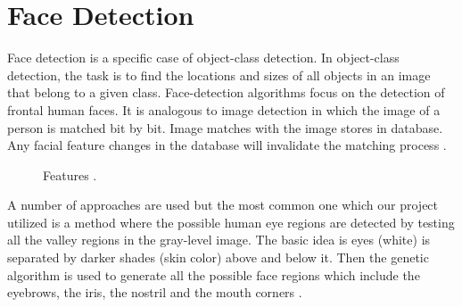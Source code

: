 \documentclass[9pt,twocolumn,twoside]{../../styles/osajnl}
\begin{document}
\section{Face Detection}

Face detection is a specific case of object-class detection. In
object-class detection, the task is to find the locations and sizes of
all objects in an image that belong to a given class. Face-detection
algorithms focus on the detection of frontal human faces. It is
analogous to image detection in which the image of a person is matched
bit by bit. Image matches with the image stores in database. Any
facial feature changes in the database will invalidate the matching
process \cite{fd-using-haar}.

\begin{figure}[htbp]
\centering
{}
\caption{Features \cite{fd-using-haar}.}
\label{fig:false-color}
\end{figure}

A number of approaches are used but the most common one which our
project utilized is a method where the possible human eye regions are
detected by testing all the valley regions in the gray-level
image. The basic idea is eyes (white) is separated by darker shades
(skin color) above and below it. Then the genetic algorithm is used to
generate all the possible face regions which include the eyebrows, the
iris, the nostril and the mouth corners \cite{fd-using-haar}.
\end{document}

